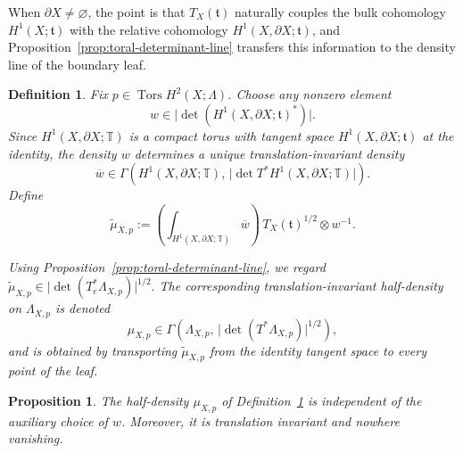\documentclass[12pt]{amsart}
\numberwithin{equation}{section}
\newtheorem{prop}[theorem]{Proposition}
\newtheorem{definition}[theorem]{Definition}
\begin{document}
When $\partial X\neq \varnothing$, the point is that $T_X(\mathfrak t)$ naturally couples the bulk
cohomology $H^1(X;\mathfrak t)$ with the relative cohomology $H^1(X,\partial X;\mathfrak t)$, and
Proposition~\ref{prop:toral-determinant-line} transfers this information to the density line of the boundary
leaf.

\begin{definition}
\label{def:Componentwise-half-density}
Fix $p\in \operatorname{Tors}H^2(X;\Lambda)$. Choose any nonzero element
\[
w\in \bigl|\det(H^1(X,\partial X;\mathfrak t)^*)\bigr|.
\]
Since $H^1(X,\partial X;\mathbb T)$ is a compact torus with tangent space
$H^1(X,\partial X;\mathfrak t)$ at the identity, the density $w$ determines a unique translation-invariant
density
\[
\overline{w}\in \Gamma\!\left(
H^1(X,\partial X;\mathbb T),\,
\bigl|\det T^* H^1(X,\partial X;\mathbb T)\bigr|
\right).
\]
Define
\begin{equation}
\label{eq:mu-tilde-definition}
\widetilde{\mu}_{X,p}
:=
\left(\int_{H^1(X,\partial X;\mathbb T)} \overline{w}\right)\,
T_X(\mathfrak t)^{1/2}\otimes w^{-1}.
\end{equation}

Using Proposition~\ref{prop:toral-determinant-line}, we regard $\widetilde{\mu}_{X,p}\in \bigl|\det(T_e^*\Lambda_{X,p})\bigr|^{1/2}.$ The corresponding translation-invariant half-density on $\Lambda_{X,p}$ is denoted
\[
\mu_{X,p}\in
\Gamma\!\left(
\Lambda_{X,p},\,
\bigl|\det(T^*\Lambda_{X,p})\bigr|^{1/2}
\right),
\]
and is obtained by transporting $\widetilde{\mu}_{X,p}$ from the identity tangent space to every point
of the leaf.
\end{definition}

\begin{prop}
\label{prop:well-defined-componentwise-half-density}
The half-density $\mu_{X,p}$ of Definition~\ref{def:Componentwise-half-density} is independent of the auxiliary
choice of $w$. Moreover, it is translation invariant and nowhere vanishing.
\end{prop}
\end{document}

